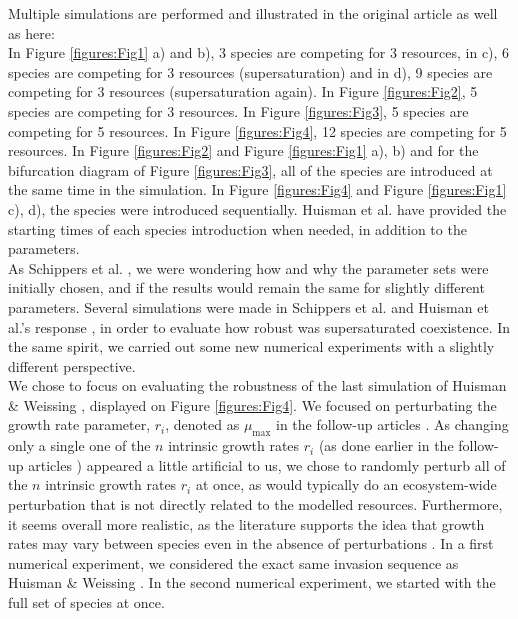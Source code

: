 Multiple simulations are performed and illustrated in the original article as well as here: \\
In Figure \ref{figures:Fig1} a) and b), 3 species are competing for 3 resources, in c), 6 species are competing for 3 resources (supersaturation) and in d), 9 species are competing for 3 resources (supersaturation again). In Figure \ref{figures:Fig2}, 5 species are competing for 3 resources. In Figure \ref{figures:Fig3}, 5 species are competing for 5 resources. In Figure \ref{figures:Fig4}, 12 species are competing for 5 resources. In Figure \ref{figures:Fig2} and Figure \ref{figures:Fig1} a), b) and for the bifurcation diagram of Figure \ref{figures:Fig3}, all of the species are introduced at the same time in the simulation. In Figure \ref{figures:Fig4} and Figure \ref{figures:Fig1} c), d), the species were introduced sequentially. Huisman et al. \cite{1999:Huisman} have provided the starting times of each species introduction when needed, in addition to the parameters.\\

As Schippers et al. \cite{2001:Schippers}, we were wondering how and why the parameter sets were initially chosen, and if the results would remain the same for slightly different parameters. Several simulations were made in Schippers et al. \cite{2001:Schippers} and Huisman et al.'s response \cite{2001:Huisman}, in order to evaluate how robust was supersaturated coexistence. In the same spirit, we carried out some new numerical experiments with a slightly different perspective.\\

We chose to focus on evaluating the robustness of the last simulation of Huisman \& Weissing \cite{1999:Huisman}, displayed on Figure \ref{figures:Fig4}. We focused on perturbating the growth rate parameter, $r_i$, denoted as $\mu_{\text{max}}$ in the follow-up articles \cite{2001:Schippers, 2001:Huisman}. As changing only a single one of the $n$ intrinsic growth rates $r_i$ (as done earlier in the follow-up articles \cite{2001:Schippers, 2001:Huisman}) appeared a little artificial to us, we chose to randomly perturb all of the $n$ intrinsic growth rates $r_i$ at once, as would typically do an ecosystem-wide perturbation that is not directly related to the modelled resources. Furthermore, it seems overall more realistic, as the literature supports the idea that growth rates may vary between species even in the absence of perturbations \cite{2015:Edwards}. In a first numerical experiment, we considered the exact same invasion sequence as Huisman \& Weissing \cite{1999:Huisman}.  In the second numerical experiment, we started with the full set of species at once.\\

